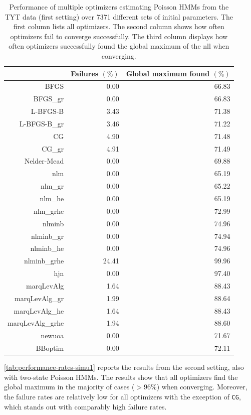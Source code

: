 \documentclass[]{interact}\usepackage[]{graphicx}\usepackage[dvipsnames]{xcolor}
\theoremstyle{plain}%
\theoremstyle{definition}
\theoremstyle{remark}
\begin{document}
\begin{table}[ht]
\centering
\caption{Performance of multiple optimizers estimating Poisson HMMs from the TYT data (first setting) over 7371 different sets of initial parameters. The first column lists all optimizers. The second column shows how often optimizers fail to converge successfully. The third column displays how often optimizers successfully found the global maximum of the nll when converging.} 
\label{tab:performance-rates-tinn}
\begin{tabular}{rrr}
  \hline
 & Failures $(\%)$ & Global maximum found $(\%)$ \\ 
  \hline
BFGS & 0.00 & 66.83 \\ 
  BFGS\_gr & 0.00 & 66.83 \\ 
  L-BFGS-B & 3.43 & 71.38 \\ 
  L-BFGS-B\_gr & 3.46 & 71.22 \\ 
  CG & 4.90 & 71.48 \\ 
  CG\_gr & 4.91 & 71.49 \\ 
  Nelder-Mead & 0.00 & 69.88 \\ 
  nlm & 0.00 & 65.19 \\ 
  nlm\_gr & 0.00 & 65.22 \\ 
  nlm\_he & 0.00 & 65.19 \\ 
  nlm\_grhe & 0.00 & 72.99 \\ 
  nlminb & 0.00 & 74.96 \\ 
  nlminb\_gr & 0.00 & 74.94 \\ 
  nlminb\_he & 0.00 & 74.96 \\ 
  nlminb\_grhe & 24.41 & 99.96 \\ 
  hjn & 0.00 & 97.40 \\ 
  marqLevAlg & 1.64 & 88.43 \\ 
  marqLevAlg\_gr & 1.99 & 88.64 \\ 
  marqLevAlg\_he & 1.64 & 88.43 \\ 
  marqLevAlg\_grhe & 1.94 & 88.60 \\ 
  newuoa & 0.00 & 71.67 \\ 
  BBoptim & 0.00 & 72.11 \\ 
   \hline
\end{tabular}
\end{table}


\autoref{tab:performance-rates-simu1} reports the results from the second setting, also with two-state Poisson HMMs. The results show that all optimizers find the global maximum in the majority of cases ($> 96\%$) when converging. Moreover, the failure rates are relatively low for all optimizers with the exception of \texttt{CG}, which stands out with comparably high failure rates. %
\end{document}
